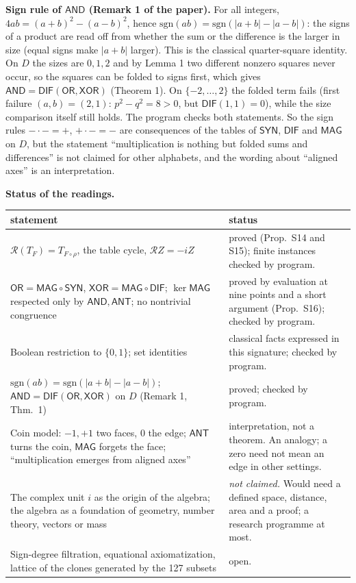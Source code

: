 \documentclass[10pt,a4paper]{article}
\newcommand{\D}{D}\newcommand{\Z}{\mathcal Z}\newcommand{\SYN}{\mathsf{SYN}}\newcommand{\DIF}{\mathsf{DIF}}\newcommand{\OR}{\mathsf{OR}}\newcommand{\XOR}{\mathsf{XOR}}\newcommand{\AND}{\mathsf{AND}}\newcommand{\NOT}{\mathsf{NOT}}\newcommand{\ANT}{\mathsf{ANT}}\newcommand{\MAX}{\mathsf{MAX}}\newcommand{\MIN}{\mathsf{MIN}}\newcommand{\MAG}{\mathsf{MAG}}\newcommand{\chai}{Chai}\newcommand{\Fone}{\mathcal F_1}\newcommand{\Ftwo}{\mathcal F_2}\usepackage{tikz}\usetikzlibrary{arrows.meta,positioning}\newcommand{\yang}{\rule{0.8em}{0.18ex}}\newcommand{\yin}{\rule{0.25em}{0.18ex}\hspace{0.3em}\rule{0.25em}{0.18ex}}\newcommand{\tri}[3]{\raisebox{-0.01ex}{\shortstack[c]{#1\\[-0.3ex]#2\\[-0.3ex]#3}}}\newcommand{\iv}[1]{[\![#1]\!]}
\begin{document}
\textbf{Sign rule of $\mathsf{AND}$ (Remark 1 of the paper).} For all integers, $4ab=(a+b)^2-(a-b)^2$, hence $\mathrm{sgn}(ab)=\mathrm{sgn}(|a+b|-|a-b|)$: the signs of a product are read off from whether the sum or the difference is the larger in size (equal signs make $|a+b|$ larger). This is the classical quarter-square identity. On $\D$ the sizes are $0,1,2$ and by Lemma 1 two different nonzero squares never occur, so the squares can be folded to signs first, which gives $\mathsf{AND}=\mathsf{DIF}(\mathsf{OR},\mathsf{XOR})$ (Theorem 1). On $\{-2,\dots,2\}$ the folded term fails (first failure $(a,b)=(2,1)$: $p^2-q^2=8>0$, but $\mathsf{DIF}(1,1)=0$), while the size comparison itself still holds. The program checks both statements. So the sign rules $-\cdot-=+$, $+\cdot-=-$ are consequences of the tables of $\mathsf{SYN}$, $\mathsf{DIF}$ and $\mathsf{MAG}$ on $\D$, but the statement ``multiplication is nothing but folded sums and differences'' is not claimed for other alphabets, and the wording about ``aligned axes'' is an interpretation.

\textbf{Status of the readings.}
\begin{center}\small\begin{longtable}{>{\raggedright\arraybackslash}p{6cm}>{\raggedright\arraybackslash}p{9.8cm}}\toprule statement&status\\\midrule\endhead
$\mathcal R(T_F)=T_{F\circ\rho}$, the table cycle, $\mathcal RZ=-iZ$&proved (Prop.~S14 and S15); finite instances checked by program.\\
$\mathsf{OR}=\mathsf{MAG}\circ\mathsf{SYN}$, $\mathsf{XOR}=\mathsf{MAG}\circ\mathsf{DIF}$; $\ker\mathsf{MAG}$ respected only by $\mathsf{AND},\mathsf{ANT}$; no nontrivial congruence&proved by evaluation at nine points and a short argument (Prop.~S16); checked by program.\\
Boolean restriction to $\{0,1\}$; set identities&classical facts expressed in this signature; checked by program.\\
$\mathrm{sgn}(ab)=\mathrm{sgn}(|a+b|-|a-b|)$; $\mathsf{AND}=\mathsf{DIF}(\mathsf{OR},\mathsf{XOR})$ on $\D$ (Remark 1, Thm.~1)&proved; checked by program.\\
Coin model: $-1,+1$ two faces, $0$ the edge; $\mathsf{ANT}$ turns the coin, $\mathsf{MAG}$ forgets the face; ``multiplication emerges from aligned axes''&interpretation, not a theorem. An analogy; a zero need not mean an edge in other settings.\\
The complex unit $i$ as the origin of the algebra; the algebra as a foundation of geometry, number theory, vectors or mass&\emph{not claimed.} Would need a defined space, distance, area and a proof; a research programme at most.\\
Sign-degree filtration, equational axiomatization, lattice of the clones generated by the 127 subsets&open.\\
\bottomrule\end{longtable}\end{center}
\end{document}
